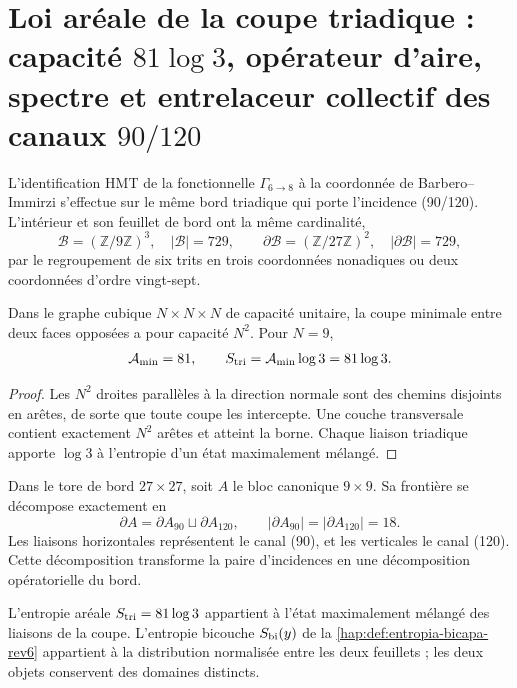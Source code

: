 \section{Loi aréale de la coupe triadique : capacité \(81\log 3\), opérateur d’aire, spectre et entrelaceur collectif des canaux \(90/120\)}
\label{hap:sec:area-entrelazamiento-barbero-rev11}

L’identification HMT de la fonctionnelle \(\Gamma_{6\to8}\) à la coordonnée
de Barbero--Immirzi s’effectue sur le même bord triadique qui porte
l’incidence (90/120). L’intérieur et son feuillet de bord ont la même cardinalité,
\[
 \mathcal B=(\mathbb Z/9\mathbb Z)^3,
 \quad |\mathcal B|=729,
 \qquad
 \partial\mathcal B=(\mathbb Z/27\mathbb Z)^2,
 \quad |\partial\mathcal B|=729,
\]
par le regroupement de six trits en trois coordonnées nonadiques ou deux
coordonnées d’ordre vingt-sept.

\begin{theorem}
\label{hap:thm:ley-areal-corte-triadico-rev11}
Dans le graphe cubique \(N\times N\times N\) de capacité unitaire, la coupe
minimale entre deux faces opposées a pour capacité \(N^2\). Pour \(N=9\),
\[
 \mathcal A_{\min}=81,
 \qquad S_{\rm tri}=\mathcal A_{\min}\log3=81\log3.
\]
\end{theorem}
\begin{proof}
Les \(N^2\) droites parallèles à la direction normale sont des chemins disjoints en
arêtes, de sorte que toute coupe les intercepte. Une couche transversale contient
exactement \(N^2\) arêtes et atteint la borne. Chaque liaison triadique apporte
\(\log3\) à l’entropie d’un état maximalement mélangé.
\end{proof}

Dans le tore de bord \(27\times27\), soit \(A\) le bloc canonique
\(9\times9\). Sa frontière se décompose exactement en
\begin{equation}
 \partial A=\partial A_{90}\sqcup\partial A_{120},
 \qquad |\partial A_{90}|=|\partial A_{120}|=18.
 \label{hap:eq:corte-90-120-rev11}
\end{equation}
Les liaisons horizontales représentent le canal (90), et les verticales le
canal (120). Cette décomposition transforme la paire d’incidences en une
décomposition opératorielle du bord.

L’entropie aréale \(S_{\rm tri}=81\log3\) appartient à l’état maximalement
mélangé des liaisons de la coupe. L’entropie bicouche
\(S_{\rm bi}(y)\) de la \cref{hap:def:entropia-bicapa-rev6} appartient à la
distribution normalisée entre les deux feuillets ; les deux objets conservent
des domaines distincts.

